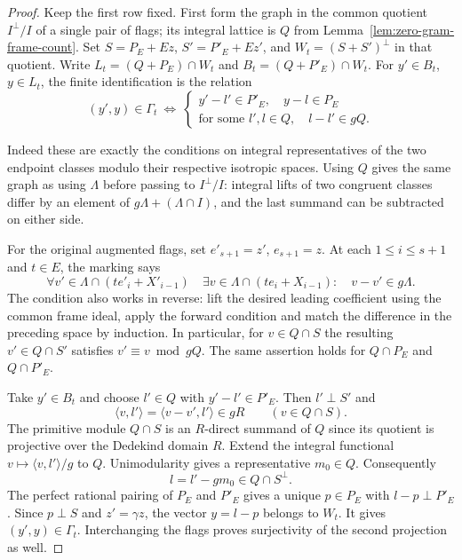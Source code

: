 \begin{proof}
Keep the first row fixed. First form the graph in the common
quotient \(I^\perp/I\) of a single pair of flags; its integral
lattice is \(Q\) from Lemma~\ref{lem:zero-gram-frame-count}.
Set \(S=P_E+Ez\), \(S'=P'_E+Ez'\), and
\(W_t=(S+S')^\perp\) in that quotient. Write
\(L_t=(Q+P_E)\cap W_t\) and \(B_t=(Q+P'_E)\cap W_t\). For
\(y'\in B_t\), \(y\in L_t\), the finite identification is the relation
\begin{equation}\label{eq:zero-gram-congruence-graph}
 (y',y)\in\Gamma_t
 \ \Longleftrightarrow\
 \begin{cases}
 y'-l'\in P'_E,\quad y-l\in P_E\\
 \text{for some }l',l\in Q,\quad l-l'\in gQ .
 \end{cases}
\end{equation}

Indeed these are exactly the conditions on integral representatives
of the two endpoint classes modulo their respective isotropic spaces.
Using \(Q\) gives the same graph as using \(\Lambda\) before passing
to \(I^\perp/I\): integral lifts of two congruent classes differ by
an element of \(g\Lambda+(\Lambda\cap I)\), and the last summand can
be subtracted on either side.

For the original augmented flags, set \(e'_{s+1}=z'\),
\(e_{s+1}=z\). At each \(1\le i\le s+1\) and \(t\in E\), the
marking says
\[
 \forall v'\in\Lambda\cap(te'_i+X'_{i-1})\quad
 \exists v\in\Lambda\cap(te_i+X_{i-1}):
                     \quad v-v'\in g\Lambda .
\] The
condition also works in reverse: lift the desired leading coefficient
using the common frame ideal, apply the forward condition and match
the difference in the preceding space by induction. In particular,
for \(v\in Q\cap S\) the resulting \(v'\in Q\cap S'\) satisfies
\(v'\equiv v\bmod gQ\). The same assertion holds for \(Q\cap P_E\)
and \(Q\cap P'_E\).

Take \(y'\in B_t\) and choose \(l'\in Q\) with \(y'-l'\in P'_E\).
Then \(l'\perp S'\) and
\[
 \langle v,l'\rangle=\langle v-v',l'\rangle\in gR
       \qquad(v\in Q\cap S).
\]
The primitive module \(Q\cap S\) is an \(R\)-direct summand of
\(Q\) since its quotient is projective over the Dedekind domain \(R\).
Extend the integral functional \(v\mapsto\langle v,l'\rangle/g\)
to \(Q\). Unimodularity gives a representative \(m_0\in Q\).
Consequently
\[
      l=l'-gm_0\in Q\cap S^\perp .
\]
The perfect rational pairing of \(P_E\) and \(P'_E\) gives a
unique \(p\in P_E\) with \(l-p\perp P'_E\). Since \(p\perp S\)
and \(z'=\gamma z\), the vector \(y=l-p\) belongs to \(W_t\).
It gives \((y',y)\in\Gamma_t\). Interchanging the flags proves
surjectivity of the second projection as well.


\end{proof}
